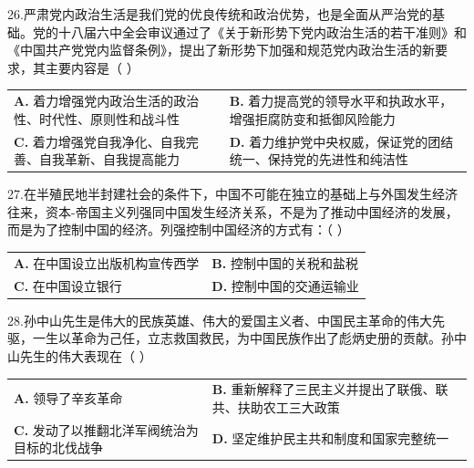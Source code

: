 \documentclass[UTF8,11pt]{ctexart}
\begin{document}
26.严肃党内政治生活是我们党的优良传统和政治优势，也是全面从严治党的基础。党的十八届六中全会审议通过了《关于新形势下党内政治生活的若干准则》和《中国共产党党内监督条例》，提出了新形势下加强和规范党内政治生活的新要求，其主要内容是（     ）


\begin{center}\begin{tabular}{>{\raggedright\arraybackslash}p{\dimexpr(\linewidth-4\tabcolsep)/2\relax}>{\raggedright\arraybackslash}p{\dimexpr(\linewidth-4\tabcolsep)/2\relax}}
\textbf{A.} 着力增强党内政治生活的政治性、时代性、原则性和战斗性 & \textbf{B.} 着力提高党的领导水平和执政水平，增强拒腐防变和抵御风险能力\\[.35em]
\textbf{C.} 着力增强党自我净化、自我完善、自我革新、自我提高能力 & \textbf{D.} 着力维护党中央权威，保证党的团结统一、保持党的先进性和纯洁性\\[.35em]\end{tabular}\end{center}

27.在半殖民地半封建社会的条件下，中国不可能在独立的基础上与外国发生经济往来，资本-帝国主义列强同中国发生经济关系，不是为了推动中国经济的发展，而是为了控制中国的经济。列强控制中国经济的方式有：（     ）


\begin{center}\begin{tabular}{>{\raggedright\arraybackslash}p{\dimexpr(\linewidth-4\tabcolsep)/2\relax}>{\raggedright\arraybackslash}p{\dimexpr(\linewidth-4\tabcolsep)/2\relax}}
\textbf{A.} 在中国设立出版机构宣传西学 & \textbf{B.} 控制中国的关税和盐税\\[.35em]
\textbf{C.} 在中国设立银行 & \textbf{D.} 控制中国的交通运输业\\[.35em]\end{tabular}\end{center}

28.孙中山先生是伟大的民族英雄、伟大的爱国主义者、中国民主革命的伟大先驱，一生以革命为己任，立志救国救民，为中国民族作出了彪炳史册的贡献。孙中山先生的伟大表现在（     ）


\begin{center}\begin{tabular}{>{\raggedright\arraybackslash}p{\dimexpr(\linewidth-4\tabcolsep)/2\relax}>{\raggedright\arraybackslash}p{\dimexpr(\linewidth-4\tabcolsep)/2\relax}}
\textbf{A.} 领导了辛亥革命 & \textbf{B.} 重新解释了三民主义并提出了联俄、联共、扶助农工三大政策\\[.35em]
\textbf{C.} 发动了以推翻北洋军阀统治为目标的北伐战争 & \textbf{D.} 坚定维护民主共和制度和国家完整统一\\[.35em]\end{tabular}\end{center}
\end{document}
